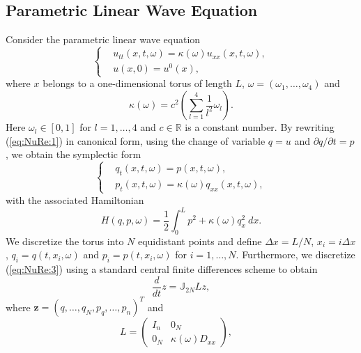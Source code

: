\subsection{Parametric Linear Wave Equation} \label{chap:NuRe:1.1} Consider the parametric linear wave equation
\begin{equation} \label{eq:NuRe:1}
\left\{
\begin{aligned}
& u_{tt}(x,t,\omega) = \kappa(\omega) u_{xx}(x,t,\omega), \\
& u(x,0) = u^0(x),
\end{aligned}
\right.
\end{equation}
where $x$ belongs to a one-dimensional torus of length $L$, $\omega = (\omega_1,\dots,\omega_4)$ and
\begin{equation} \label{eq:NuRe:2}
	\kappa(\omega) = c^2\left( \sum_{l=1}^4 \frac{1}{l^2} \omega_l \right).
\end{equation}
Here $\omega_l \in [0,1]$ for $l=1,\dots,4$ and $c\in \mathbb{R}$ is a constant number. By rewriting (\ref{eq:NuRe:1}) in canonical form, using the change of variable $q = u$ and $\partial q/ \partial t= p$, we obtain the symplectic form
\begin{equation} \label{eq:NuRe:3}
\left\{
\begin{aligned}
& q_t(x,t,\omega) = p(x,t,\omega), \\
& p_t(x,t,\omega) = \kappa(\omega) q_{xx}(x,t,\omega),
\end{aligned}
\right.
\end{equation}
with the associated Hamiltonian
\begin{equation} \label{eq:NuRe:4}
	H(q,p,\omega) = \frac 1 2 \int_0^L p^2 + \kappa(\omega) q_x^2 \ dx.
\end{equation}
We discretize the torus into $N$ equidistant points and define $\Delta x = L/N$, $x_i = i\Delta x$, $q_i=q(t,x_i,\omega)$ and $p_i=p(t,x_i,\omega)$ for $i = 1, \dots, N$. Furthermore, we discretize (\ref{eq:NuRe:3}) using a standard central finite differences scheme to obtain
\begin{equation} \label{eq:NuRe:5}
	\frac{d}{dt} z = \mathbb{J}_{2N} L z,
\end{equation}
where $\mathbf z=(q,\dots,q_N,p_q,\dots,p_n)^T$ and
\begin{equation} \label{eq:NuRe:6}
L = 
\begin{pmatrix}
	I_n & 0_N \\
	0_N & \kappa(\omega)D_{xx}
\end{pmatrix},\quad 
\end{equation}
